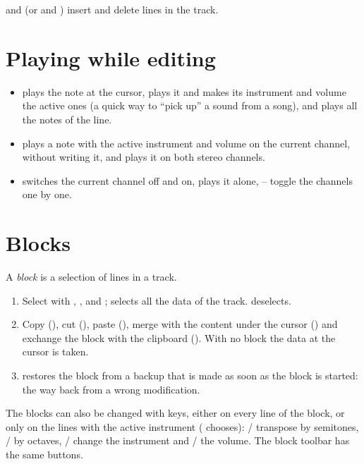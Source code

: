  and  (or  and ) insert and delete lines in the track.

\section{Playing while editing}

\begin{itemize}
  \item {} plays the note at the cursor,  plays it and makes its instrument and volume the active ones
        (a quick way to ``pick up'' a sound from a song), and  plays all the notes of the line.
  \item {} plays a note with the active instrument and volume on the current channel, without writing it, and
         plays it on both stereo channels.
  \item {} switches the current channel off and on,  plays it alone, -- toggle
        the channels one by one.
\end{itemize}

\section{Blocks}

A \emph{block} is a selection of lines in a track.

\begin{enumerate}
  \item Select with , ,  and ;  selects all the data of the
        track.  deselects.
  \item Copy (), cut (), paste (), merge with the content under the cursor
        () and exchange the block with the clipboard (). With no block the data at the cursor
        is taken.
  \item {} restores the block from a backup that is made as soon as the block is started: the way back from a wrong
        modification.
\end{enumerate}

The blocks can also be changed with keys, either on every line of the block, or only on the lines with the active instrument
( chooses): / transpose by semitones, / by octaves,
/ change the instrument and / the volume. The block toolbar has the same
buttons.


